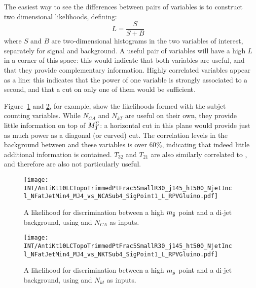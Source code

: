 The easiest way to see the differences between pairs of variables is to construct two dimensional likelihoods, defining:
%
\begin{equation}
L = \frac{S}{S+B}
\end{equation}
%
where $S$ and $B$ are two-dimensional histograms in the two variables of interest, separately for signal and background. A useful pair of variables will have a high $L$ in a corner of this space: this would indicate that both variables are useful, and that they provide complementary information. Highly correlated variables appear as a line: this indicates that the power of one variable is strongly associated to a second, and that a cut on only one of them would be sufficient. 

Figure~\ref{fig:search:search:optimization:2D:NCA} and \ref{fig:search:search:optimization:2D:NKT}, for example, show the likelihoods formed with the subjet counting variables. While $N_{CA}$ and $N_{kT}$ are useful on their own, they provide little information on top of $M_{\textrm{J}}^{\Sigma}$: a horizontal cut in this plane would provide just as much power as a diagonal (or curved) cut. The correlation levels in the background between \MJ and these variables is over $60\%$, indicating that indeed little additional information is contained. $T_{32}$ and $T_{21}$ are also similarly correlated to \MJ, and therefore are also not particularly useful.



\begin{figure}
\centering
\texttt{[image: INT/AntiKt10LCTopoTrimmedPtFrac5SmallR30\_j145\_ht500\_NjetIncl\_NFatJetMin4\_MJ4\_vs\_NCASub4\_SigPoint1\_L\_RPVGluino.pdf]}
\label{fig:search:search:optimization:2D:NCA}
\caption{A likelihood for discrimination between a high $m_{\tilde{g}}$ point and a \herwigpp di-jet background, using \MJ and $N_{CA}$ as inputs.}
\end{figure}




\begin{figure}
\centering
\texttt{[image: INT/AntiKt10LCTopoTrimmedPtFrac5SmallR30\_j145\_ht500\_NjetIncl\_NFatJetMin4\_MJ4\_vs\_NKTSub4\_SigPoint1\_L\_RPVGluino.pdf]}
\label{fig:search:search:optimization:2D:NKT}
\caption{A likelihood for discrimination between a high $m_{\tilde{g}}$ point and a \herwigpp di-jet background, using \MJ and $N_{kt}$ as inputs.}
\end{figure}

